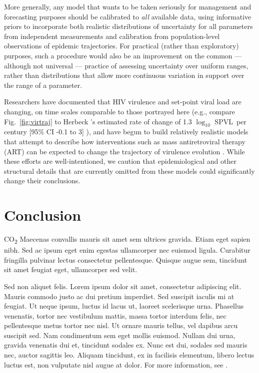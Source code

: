 \documentclass[10pt,letterpaper]{article}
\newcommand{\Lspvl}{$\log_{10}$ SPVL}
\begin{document}
More generally, any model that wants to be
taken seriously for management and forecasting purposes should
be calibrated to \emph{all} available data, using informative
priors to incorporate both realistic distributions of uncertainty
for all parameters from independent measurements \cite{elderd_uncertainty_2006}
and calibration from population-level observations of epidemic
trajectories. For practical (rather than exploratory) purposes,
such a procedure would also be an improvement on the common --- although not universal --- %
practice of assessing uncertainty over uniform ranges, rather than
distributions that allow more continuous variation in support over
the range of a parameter.

Researchers have documented that HIV virulence and set-point viral
load are changing, on time scales comparable to those portrayed here
(e.g., compare Fig.~\ref{fig:virtraj} to Herbeck 's
estimated rate of change of 1.3 \Lspvl\ per century [95\% CI -0.1 to
  3] \cite{herbeck_is_2012}), and have begun to build relatively realistic models that
attempt to describe how interventions such as mass antiretroviral
therapy (ART) can be expected to change the trajectory of virulence
evolution \cite{payne_impact_2014,herbeck2016evolution}.  While these
efforts are well-intentioned, we caution that epidemiological and
other structural details that are currently omitted from these models
could significantly change their conclusions.

\section*{Conclusion}

CO\textsubscript{2} Maecenas convallis mauris sit amet sem ultrices gravida. Etiam eget sapien nibh. Sed ac ipsum eget enim egestas ullamcorper nec euismod ligula. Curabitur fringilla pulvinar lectus consectetur pellentesque. Quisque augue sem, tincidunt sit amet feugiat eget, ullamcorper sed velit. 

Sed non aliquet felis. Lorem ipsum dolor sit amet, consectetur adipiscing elit. Mauris commodo justo ac dui pretium imperdiet. Sed suscipit iaculis mi at feugiat. Ut neque ipsum, luctus id lacus ut, laoreet scelerisque urna. Phasellus venenatis, tortor nec vestibulum mattis, massa tortor interdum felis, nec pellentesque metus tortor nec nisl. Ut ornare mauris tellus, vel dapibus arcu suscipit sed. Nam condimentum sem eget mollis euismod. Nullam dui urna, gravida venenatis dui et, tincidunt sodales ex. Nunc est dui, sodales sed mauris nec, auctor sagittis leo. Aliquam tincidunt, ex in facilisis elementum, libero lectus luctus est, non vulputate nisl augue at dolor. For more information, see .
\end{document}
